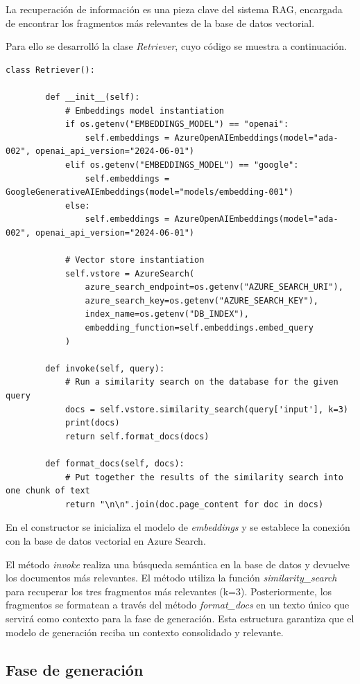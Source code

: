 La recuperación de información es una pieza clave del sistema RAG, encargada de encontrar los fragmentos más relevantes de la base de datos vectorial.

Para ello se desarrolló la clase \textit{Retriever}, cuyo código se muestra a continuación. 

\begin{lstlisting}[label=cod:retriever,caption=Clase \textit{Retriever}.]
	class Retriever():
	
		def __init__(self):
			# Embeddings model instantiation
			if os.getenv("EMBEDDINGS_MODEL") == "openai":
				self.embeddings = AzureOpenAIEmbeddings(model="ada-002", openai_api_version="2024-06-01")
			elif os.getenv("EMBEDDINGS_MODEL") == "google":    
				self.embeddings = GoogleGenerativeAIEmbeddings(model="models/embedding-001")
			else:
				self.embeddings = AzureOpenAIEmbeddings(model="ada-002", openai_api_version="2024-06-01")
	
			# Vector store instantiation
			self.vstore = AzureSearch(
				azure_search_endpoint=os.getenv("AZURE_SEARCH_URI"),
				azure_search_key=os.getenv("AZURE_SEARCH_KEY"),
				index_name=os.getenv("DB_INDEX"),
				embedding_function=self.embeddings.embed_query
			)
	
		def invoke(self, query):
			# Run a similarity search on the database for the given query
			docs = self.vstore.similarity_search(query['input'], k=3)
			print(docs)
			return self.format_docs(docs)
		
		def format_docs(self, docs):
			# Put together the results of the similarity search into one chunk of text
			return "\n\n".join(doc.page_content for doc in docs)
\end{lstlisting}

En el constructor se inicializa el modelo de \textit{embeddings} y se establece la conexión con la base de datos vectorial en Azure Search.

El método \textit{invoke} realiza una búsqueda semántica en la base de datos y devuelve los documentos más relevantes. El método utiliza la 
función \textit{similarity\_search} para recuperar los tres fragmentos más relevantes (k=3). Posteriormente, los fragmentos se 
formatean a través del método \textit{format\_docs} en un texto único que servirá como contexto para la fase de generación. Esta 
estructura garantiza que el modelo de generación reciba un contexto consolidado y relevante.

\subsection{Fase de generación}

